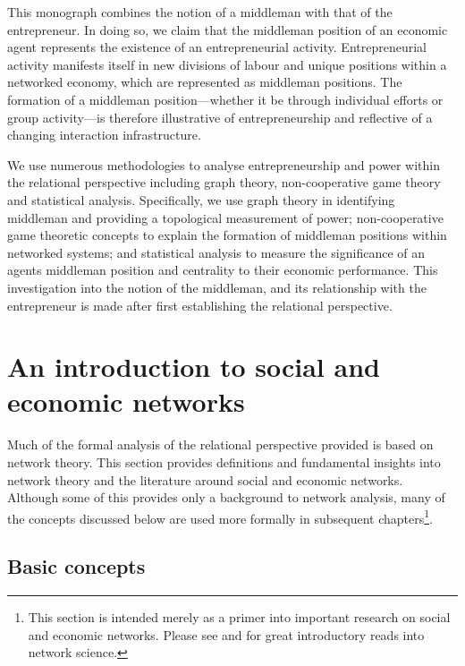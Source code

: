 This monograph combines the notion of a middleman with that of the entrepreneur. In doing so, we claim that the middleman position of an economic agent represents the existence of an entrepreneurial activity. Entrepreneurial activity manifests itself in new divisions of labour and unique positions within a networked economy, which are represented as middleman positions. The formation of a middleman position---whether it be through individual efforts or group activity---is therefore illustrative of entrepreneurship and reflective of a changing interaction infrastructure.

We use numerous methodologies to analyse entrepreneurship and power within the relational perspective including graph theory, non-cooperative game theory and statistical analysis. Specifically, we use graph theory in identifying middleman and providing a topological measurement of power; non-cooperative game theoretic concepts to explain the formation of middleman positions within networked systems; and statistical analysis to measure the significance of an agents middleman position and centrality to their economic performance. This investigation into the notion of the middleman, and its relationship with the entrepreneur is made after first establishing the relational perspective.

\section{An introduction to social and economic networks}
\label{sec:socialeconomicnetworks}

Much of the formal analysis of the relational perspective provided is based on network theory. This section provides definitions and fundamental insights into network theory and the literature around social and economic networks. Although some of this provides only a background to network analysis, many of the concepts discussed below are used more formally in subsequent chapters\footnote{This section is intended merely as a primer into important research on social and economic networks. Please see \citet{Newman2010} and \citet{Barabasi2016} for great introductory reads into network science.}.

\subsection{Basic concepts}

